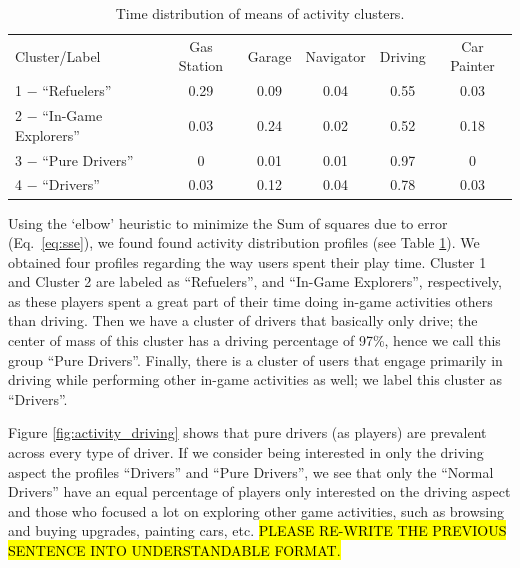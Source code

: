 \documentclass[preprint,authoryear,12pt]{elsarticle}
\begin{document}
\begin{table}[tb]
	\renewcommand*{\arraystretch}{1.2}
	\caption{Time distribution of means of activity clusters.}
	\begin{center}
		\begin{tabular}{l|c|c|c|c|c}
			Cluster/Label & Gas Station &	Garage & Navigator & Driving & Car Painter\\
			1 $-$ ``Refuelers'' &	0.29 &	0.09 &	0.04 &	0.55 &	0.03\\
			2 $-$ ``In-Game Explorers'' &	0.03 &	0.24 &	0.02 &	0.52 &	0.18 \\
			3 $-$ ``Pure Drivers'' &	0 &	0.01 &	0.01 &	0.97 &	0  \\
			4 $-$ ``Drivers'' &	0.03 &	0.12 &	0.04 &	0.78 &	0.03   \\
		\end{tabular}
	\end{center}
	\label{T:cluster_activities}
\end{table}

Using the `elbow' heuristic to minimize the Sum of squares due to error (Eq.~\ref{eq:sse}), we found found activity distribution profiles (see Table \ref{T:cluster_activities}).
We obtained four profiles regarding the way users spent their play time. Cluster 1 and Cluster 2 are labeled as ``Refuelers'', and ``In-Game Explorers'', respectively, as these players spent a great part of their time doing in-game activities others than driving. Then we have a cluster of drivers that basically only drive; the center of mass of this cluster has a driving percentage of 97\%, hence we call this group ``Pure Drivers''. Finally, there is a cluster of users that engage primarily in driving while performing other in-game activities as well; we label this cluster as ``Drivers''.



Figure \ref{fig:activity_driving} shows that pure drivers (as players) are prevalent across every type of driver.
If we consider being interested in only the driving aspect the profiles ``Drivers'' and ``Pure Drivers'', we see that only the ``Normal Drivers'' have an equal percentage of players only interested on the driving aspect and those who focused a lot on exploring other game activities, such as browsing and buying upgrades, painting cars, etc. \hl{PLEASE RE-WRITE THE PREVIOUS SENTENCE INTO UNDERSTANDABLE FORMAT.}
\end{document}
